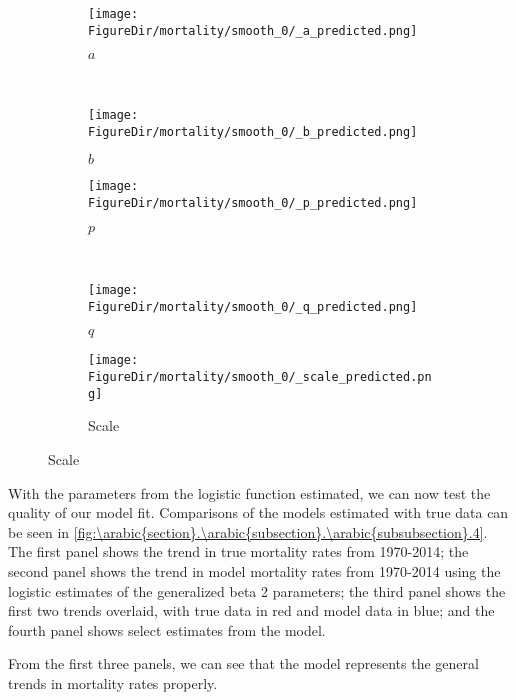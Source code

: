 \documentclass[10pt]{article}
\renewcommand{\thesection}{\arabic{section}}
\renewcommand{\thesubsection}{\thesection.\arabic{subsection}}
\renewcommand{\thesubsubsection}{\thesubsection.\arabic{subsubsection}}
\numberwithin{equation}{subsection}
\newcommand*{\FigureDir}{../../graphs}
\begin{document}
\begin{figure}[!ht]
	\centering
   \caption{\label{fig:\thesubsubsection.3}Mortality Generalized Beta 2 Parameter Estimates}
		\begin{subfigure}{0.5\textwidth}
			\centering
			\texttt{[image: \\FigureDir/mortality/smooth\_0/\_a\_predicted.png]}
			\caption{\(a\)}
		\end{subfigure}%
		~ %
		\begin{subfigure}{0.5\textwidth}
			\centering
			\texttt{[image: \\FigureDir/mortality/smooth\_0/\_b\_predicted.png]}
			\caption{\(b\)}
		\end{subfigure}%
		\newline
		\begin{subfigure}{0.5\textwidth}
			\centering
			\texttt{[image: \\FigureDir/mortality/smooth\_0/\_p\_predicted.png]}
			\caption{\(p\)}
		\end{subfigure}%
		~ %
		\begin{subfigure}{0.5\textwidth}
			\centering
			\texttt{[image: \\FigureDir/mortality/smooth\_0/\_q\_predicted.png]}
			\caption{\(q\)}
      \end{subfigure}%
      \newline
		\begin{subfigure}{0.5\textwidth}
			\centering
			\texttt{[image: \\FigureDir/mortality/smooth\_0/\_scale\_predicted.png]}
			\caption{Scale}
		\end{subfigure}%
\end{figure}

\par With the parameters from the logistic function estimated, we can now test the quality of our model fit. Comparisons of the models estimated with true data can be seen in \autoref{fig:\thesubsubsection.4}. The first panel shows the trend in true mortality rates from 1970-2014; the second panel shows the trend in model mortality rates from 1970-2014 using the logistic estimates of the generalized beta 2 parameters; the third panel shows the first two trends overlaid, with true data in red and model data in blue; and the fourth panel shows select estimates from the model.

\par From the first three panels, we can see that the model represents the general trends in mortality rates properly. 
\end{document}
